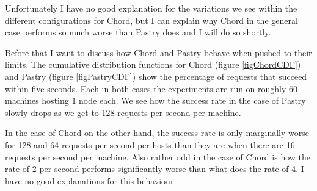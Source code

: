 Unfortunately I have no good explanation for the variations we see within the different configurations for Chord, but I can explain why Chord in the general case performs so much worse than Pastry does and I will do so shortly.

Before that I want to discuss how Chord and Pastry behave when pushed to their limits. The cumulative distribution functions for Chord (figure \ref{figChordCDF}) and Pastry (figure \ref{figPastryCDF}) show the percentage of requests that succeed within five seconds. Each in both cases the experiments are run on roughly 60 machines hosting 1 node each. We see how the success rate in the case of Pastry slowly drops as we get to 128 requests per second per machine.

In the case of Chord on the other hand, the success rate is only marginally worse for 128 and 64 requests per second per hosts than they are when there are 16 requests per second per machine. Also rather odd in the case of Chord is how the rate of 2 per second performs significantly worse than what does the rate of 4. I have no good explanations for this behaviour.

